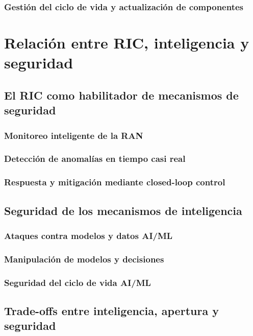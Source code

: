 \documentclass[11pt,a4paper]{article}
\makeatletter
\let\ORIGsection\section
\def\section{\@nobreakfalse\ORIGsection}
\let\ORIGsubsection\subsection
\def\subsection{\@nobreakfalse\ORIGsubsection}
\let\ORIGsubsubsection\subsubsection
\def\subsubsection{\@nobreakfalse\ORIGsubsubsection}
\makeatother
\begin{document}
\subsubsection{Gestión del ciclo de vida y actualización de componentes}


\section{Relación entre RIC, inteligencia y seguridad}

\subsection{El RIC como habilitador de mecanismos de seguridad}

\subsubsection{Monitoreo inteligente de la RAN}
\subsubsection{Detección de anomalías en tiempo casi real}
\subsubsection{Respuesta y mitigación mediante closed-loop control}

\subsection{Seguridad de los mecanismos de inteligencia}

\subsubsection{Ataques contra modelos y datos AI/ML}
\subsubsection{Manipulación de modelos y decisiones}
\subsubsection{Seguridad del ciclo de vida AI/ML}

\subsection{Trade-offs entre inteligencia, apertura y seguridad}
\end{document}
